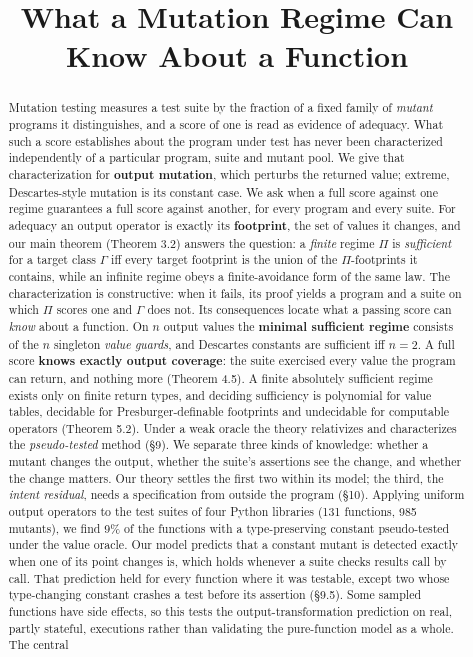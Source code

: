 \documentclass[conference]{IEEEtran}
\theoremstyle{run}
\begin{document}
\title{What a Mutation Regime Can Know About a Function}
\author{}
\maketitle
\begin{abstract}
Mutation testing measures a test suite by the fraction of a fixed family of \emph{mutant} programs it distinguishes, and a score of one is read as evidence of adequacy. What such a score establishes about the program under test has never been characterized independently of a particular program, suite and mutant pool. We give that characterization for \textbf{output mutation}, which perturbs the returned value; extreme, Descartes-style mutation is its constant case. We ask when a full score against one regime guarantees a full score against another, for every program and every suite. For adequacy an output operator is exactly its \textbf{footprint}, the set of values it changes, and our main theorem (Theorem 3.2) answers the question: a \emph{finite} regime $\Pi$ is \emph{sufficient} for a target class $\Gamma$ iff every target footprint is the union of the $\Pi$-footprints it contains, while an infinite regime obeys a finite-avoidance form of the same law. The characterization is constructive: when it fails, its proof yields a program and a suite on which $\Pi$ scores one and $\Gamma$ does not. Its consequences locate what a passing score can \emph{know} about a function. On $n$ output values the \textbf{minimal sufficient regime} consists of the $n$ singleton \emph{value guards}, and Descartes constants are sufficient iff $n = 2$. A full score \textbf{knows exactly output coverage}: the suite exercised every value the program can return, and nothing more (Theorem 4.5). A finite absolutely sufficient regime exists only on finite return types, and deciding sufficiency is polynomial for value tables, decidable for Presburger-definable footprints and undecidable for computable operators (Theorem 5.2). Under a weak oracle the theory relativizes and characterizes the \emph{pseudo-tested} method (\S 9). We separate three kinds of knowledge: whether a mutant changes the output, whether the suite's assertions see the change, and whether the change matters. Our theory settles the first two within its model; the third, the \emph{intent residual}, needs a specification from outside the program (\S 10). Applying uniform output operators to the test suites of four Python libraries (131 functions, 985 mutants), we find 9\% of the functions with a type-preserving constant pseudo-tested under the value oracle. Our model predicts that a constant mutant is detected exactly when one of its point changes is, which holds whenever a suite checks results call by call. That prediction held for every function where it was testable, except two whose type-changing constant crashes a test before its assertion (\S 9.5). Some sampled functions have side effects, so this tests the output-transformation prediction on real, partly stateful, executions rather than validating the pure-function model as a whole. The central 
\end{abstract}
\end{document}
